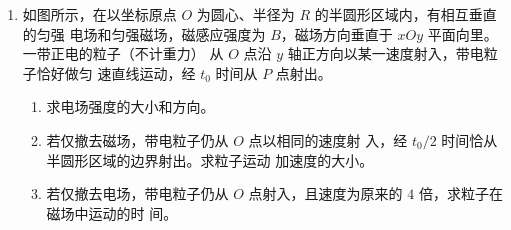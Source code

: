\begin{enumerate}
\item 
{}
如图所示，在以坐标原点 $ O $ 为圆心、半径为 $ R $ 的半圆形区域内，有相互垂直的匀强
电场和匀强磁场，磁感应强度为 $ B $，磁场方向垂直于 $ xOy $ 平面向里。一带正电的粒子（不计重力）
从 $ O $ 点沿 $ y $ 轴正方向以某一速度射入，带电粒子恰好做匀
速直线运动，经 $ t_{0} $ 时间从 $ P $ 点射出。
\begin{enumerate}
	\item
求电场强度的大小和方向。

\item 
若仅撤去磁场，带电粒子仍从 $ O $ 点以相同的速度射
入，经 $ t_{0} /2 $ 时间恰从半圆形区域的边界射出。求粒子运动
加速度的大小。



\item 
若仅撤去电场，带电粒子仍从 $ O $ 点射入，且速度为原来的 $ 4 $ 倍，求粒子在磁场中运动的时
间。

\end{enumerate}
\begin{figure}[h!]
	\flushright
	
\end{figure}





\end{enumerate}
